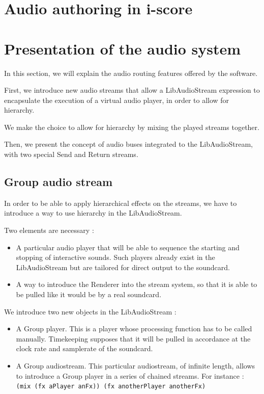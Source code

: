 \documentclass{article}
\begin{document}
\section{Audio authoring in i-score}

\section{Presentation of the audio system}
In this section, we will explain the audio routing 
features offered by the software.

First, we introduce new audio streams that allow a LibAudioStream
expression to encapsulate the execution of a virtual audio player, 
in order to allow for hierarchy.

We make the choice to allow for hierarchy by mixing the played streams together.

Then, we present the concept of audio buses integrated to the LibAudioStream,
with two special Send and Return streams.

\subsection{Group audio stream}
In order to be able to apply hierarchical effects on the streams, 
we have to introduce a way to use hierarchy in the LibAudioStream.

Two elements are necessary : 
\begin{itemize}
	\item A particular audio player that will be able to sequence the starting and stopping 
	of interactive sounds.
	Such players already exist in the LibAudioStream but are tailored for direct output to
	the soundcard.
	\item A way to introduce the Renderer into the stream system, so that it 
	is able to be pulled like it would be by a real soundcard.
\end{itemize}

We introduce two new objects in the LibAudioStream : 
\begin{itemize}
	\item A Group player. This is a player whose processing function has to be called manually. 
	Timekeeping supposes that it will be pulled in accordance at the clock rate
	and samplerate of the soundcard.
	\item A Group audiostream. This particular audiostream, of infinite length, 
	allows to introduce a Group player in a series of chained streams.
	For instance : \lstinline{(mix (fx aPlayer anFx)) (fx anotherPlayer anotherFx)}
\end{itemize}
\end{document}
